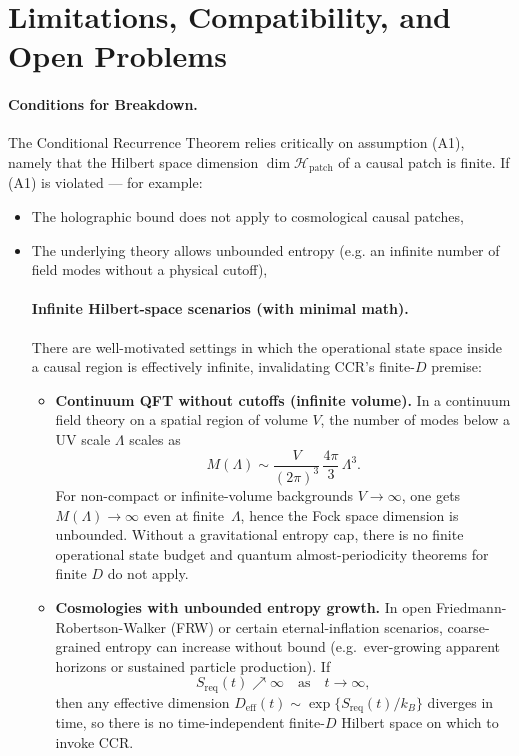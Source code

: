 \documentclass[12pt]{article}
\theoremstyle{remark}
\begin{document}
\section{Limitations, Compatibility, and Open Problems}

\paragraph{Conditions for Breakdown.}
The Conditional Recurrence Theorem relies critically on assumption (A1), namely that the Hilbert space dimension
$\dim\mathcal{H}_{\mathrm{patch}}$ of a causal patch is finite.
If (A1) is violated — for example:
\begin{itemize}
    \item The holographic bound does not apply to cosmological causal patches,
    \item The underlying theory allows unbounded entropy (e.g. an infinite number of field modes without a physical cutoff),

    \paragraph{Infinite Hilbert-space scenarios (with minimal math).}
There are well-motivated settings in which the operational state space inside a causal region
is effectively infinite, invalidating CCR's finite-$D$ premise:

\begin{itemize}
    \item \textbf{Continuum QFT without cutoffs (infinite volume).}
    In a continuum field theory on a spatial region of volume $V$, the number of modes below a UV scale $\Lambda$
    scales as
    \[
      M(\Lambda) \sim \frac{V}{(2\pi)^3}\,\frac{4\pi}{3}\,\Lambda^3.
    \]
    For non-compact or infinite-volume backgrounds $V\to\infty$, one gets $M(\Lambda)\to\infty$ even at finite~$\Lambda$,
    hence the Fock space dimension is unbounded. Without a gravitational entropy cap, there is no finite
    operational state budget and quantum almost-periodicity theorems for finite $D$ do not apply.

    \item \textbf{Cosmologies with unbounded entropy growth.}
    In open Friedmann-Robertson-Walker (FRW) or certain eternal-inflation scenarios, coarse-grained entropy can increase without bound
    (e.g.\ ever-growing apparent horizons or sustained particle production). If
    \[
       S_{\text{req}}(t)\nearrow\infty\quad\text{as}\quad t\to\infty,
    \]
    then any effective dimension $D_{\mathrm{eff}}(t)\sim \exp\{S_{\text{req}}(t)/k_B\}$ diverges in time, so there is
    no time-independent finite-$D$ Hilbert space on which to invoke CCR.


\end{itemize}
\end{itemize}
\end{document}
